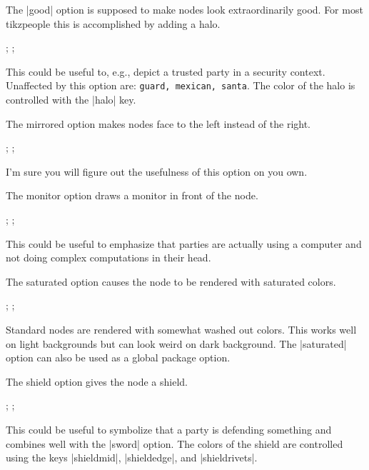 \documentclass{ltxdoc}
\newcommand{\DescribeOption}[1]{\leavevmode
	\marginpar{\raggedleft\strut\MacroFont\string #1\ }}
\begin{document}
	\DescribeOption{good}	The |good| option is supposed to make nodes look extraordinarily good.
		For most tikzpeople this is accomplished by adding a halo.
		\begin{codeexample}{3.2cm}
\node[sailor,minimum size=1cm,xshift=-1.2cm]{};
\node[sailor,good,minimum size=1cm]{};
		\end{codeexample}
		This could be useful to, e.g., depict a trusted party in a security context.
		Unaffected by this option are: \texttt{guard, mexican, santa}.
		The color of the halo is controlled with the |halo| key.
		
	\DescribeOption{mirrored}	The \textsf{mirrored} option makes nodes face to the left instead of the right.
		\begin{codeexample}{3.2cm}
\node[graduate,minimum size=1cm,xshift=-1.2cm]{};
\node[graduate,mirrored,minimum size=1cm]{};
		\end{codeexample}
		I'm sure you will figure out the usefulness of this option on you own.

	\DescribeOption{monitor} The \textsf{monitor} option draws a monitor in front of the node.
		\begin{codeexample}{4cm}
\node[judge,minimum size=1cm,xshift=-1.2cm]{};
\node[judge,monitor,minimum size=1cm]{};
		\end{codeexample}
		This could be useful to emphasize that parties are actually using a computer and not doing complex computations in their head.
	
	\DescribeOption{saturated} The \textsf{saturated} option causes the node to be rendered with saturated colors.
		\begin{codeexample}{3.2cm}
\node[pilot,minimum size=1cm,xshift=-1.2cm]{};
\node[pilot,saturated,minimum size=1cm]{};
		\end{codeexample}
		Standard nodes are rendered with somewhat washed out colors.
		This works well on light backgrounds but can look weird on dark background.
		The |saturated| option can also be used as a global package option.

	\DescribeOption{shield} The \textsf{shield} option gives the node a shield.
		\begin{codeexample}{4cm}
\node[alice,minimum size=1cm,xshift=-1.2cm]{};
\node[alice,shield,minimum size=1cm]{};
		\end{codeexample}
		This could be useful to symbolize that a party is defending something and combines well with the |sword| option.
		The colors of the shield are controlled using the keys |shieldmid|, |shieldedge|, and |shieldrivets|.
	
\end{document}
